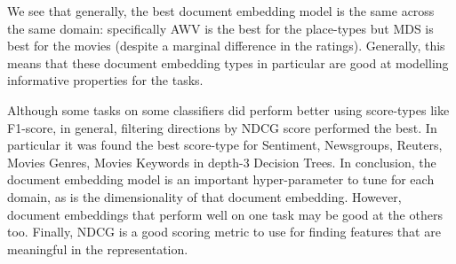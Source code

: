  We see that generally, the best document embedding model is the same across the same domain: specifically AWV is the best for the place-types but MDS is best for the movies (despite a marginal difference in the ratings). Generally, this  means that these document embedding types in particular are good at modelling informative properties for the tasks. 
 
 Although some tasks on some classifiers did perform better using score-types like F1-score, in general, filtering directions by NDCG score performed the best. In particular it was found  the best score-type for Sentiment, Newsgroups, Reuters, Movies Genres, Movies Keywords in depth-3 Decision Trees.  In conclusion, the document embedding model is an important hyper-parameter to tune for each domain, as is the dimensionality of that document embedding. However, document embeddings that perform well on one task may be good at the others too. Finally, NDCG is a good scoring metric to use for finding features that are meaningful in the representation.
 



